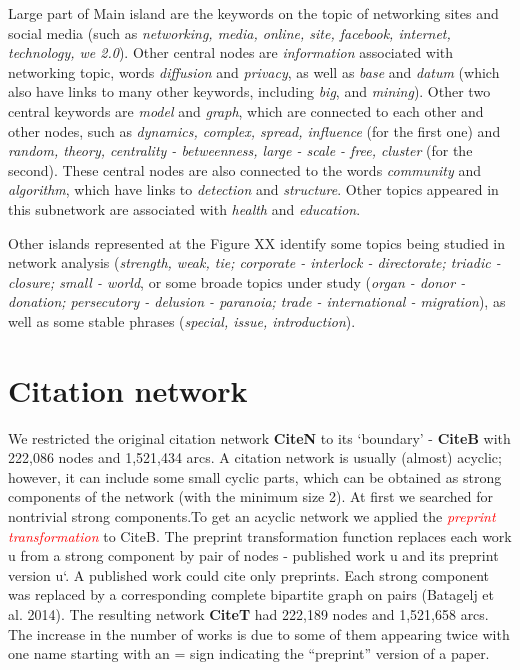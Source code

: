 \documentclass[11pt]{article} %
\newcommand{\keyw}[1]{\textcolor{red}{\emph{#1}}}
\begin{document}
Large part of Main island are the keywords on the topic of networking sites and social media (such as \textit{networking, media, online, site, facebook, internet, technology, we 2.0}). Other central nodes are \textit{information} associated with networking topic,  words \textit{diffusion} and \textit{privacy}, as well as \textit{base} and \textit{datum} (which also have links to many other keywords, including \textit{big}, and \textit{mining}). Other two central keywords are \textit{model} and \textit{graph}, which are connected to each other and other nodes, such as \textit{dynamics, complex, spread, influence} (for the first one) and \textit{random, theory, centrality - betweenness, large - scale - free, cluster} (for the second). These central nodes are also connected to the words \textit{community} and \textit{algorithm}, which have links to \textit{detection} and \textit{structure}. Other topics appeared in this subnetwork are associated with \textit{health} and \textit{education}. \medskip


Other islands represented at the Figure XX identify some topics being studied in network analysis (\textit{strength, weak, tie; corporate - interlock - directorate; triadic - closure; small - world}, or some broade topics under study (\textit{organ - donor - donation; persecutory - delusion - paranoia; trade - international - migration}), as well as some stable phrases (\textit{special, issue, introduction}). \medskip


\section{Citation network}  

We restricted the original citation network \textbf{CiteN} to its `boundary' - \textbf{CiteB} with 222,086 nodes and 1,521,434 arcs. A citation network is usually (almost) acyclic; however, it can include some small cyclic parts, which can be obtained as strong components of the network (with the minimum size 2). At first we searched for nontrivial strong components.To get an acyclic network we applied the \keyw{preprint transformation} to CiteB. The preprint transformation function replaces each work u from a strong component by pair of nodes - published work u and its preprint version u`. A published work could cite only preprints. Each strong component was replaced by a corresponding complete bipartite graph on pairs (Batagelj et al. 2014). The resulting network \textbf{CiteT} had 222,189 nodes and 1,521,658 arcs. The increase in the number of works is due to some of them appearing twice with one name starting with an = sign indicating the “preprint” version of a paper.\medskip
\end{document}
